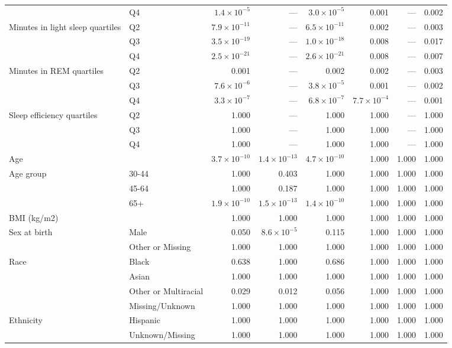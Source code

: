 \documentclass[11pt]{article}
\begin{document}
\begin{longtable}{@{}p{4.0cm}p{2.6cm}rrrrrr@{}}
 & Q4 & $1.4\times10^{-5}$ & --- & $3.0\times10^{-5}$ & 0.001 & --- & 0.002 \\
Minutes in light sleep quartiles & Q2 & $7.9\times10^{-11}$ & --- & $6.5\times10^{-11}$ & 0.002 & --- & 0.003 \\
 & Q3 & $3.5\times10^{-19}$ & --- & $1.0\times10^{-18}$ & 0.008 & --- & 0.017 \\
 & Q4 & $2.5\times10^{-21}$ & --- & $2.6\times10^{-21}$ & 0.008 & --- & 0.007 \\
Minutes in REM quartiles & Q2 & 0.001 & --- & 0.002 & 0.002 & --- & 0.003 \\
 & Q3 & $7.6\times10^{-6}$ & --- & $3.8\times10^{-5}$ & 0.001 & --- & 0.002 \\
 & Q4 & $3.3\times10^{-7}$ & --- & $6.8\times10^{-7}$ & $7.7\times10^{-4}$ & --- & 0.001 \\
Sleep efficiency quartiles & Q2 & 1.000 & --- & 1.000 & 1.000 & --- & 1.000 \\
 & Q3 & 1.000 & --- & 1.000 & 1.000 & --- & 1.000 \\
 & Q4 & 1.000 & --- & 1.000 & 1.000 & --- & 1.000 \\
Age &  & $3.7\times10^{-10}$ & $1.4\times10^{-13}$ & $4.7\times10^{-10}$ & 1.000 & 1.000 & 1.000 \\
Age group & 30-44 & 1.000 & 0.403 & 1.000 & 1.000 & 1.000 & 1.000 \\
 & 45-64 & 1.000 & 0.187 & 1.000 & 1.000 & 1.000 & 1.000 \\
 & 65+ & $1.9\times10^{-10}$ & $1.5\times10^{-13}$ & $1.4\times10^{-10}$ & 1.000 & 1.000 & 1.000 \\
BMI (kg/m2) &  & 1.000 & 1.000 & 1.000 & 1.000 & 1.000 & 1.000 \\
Sex at birth & Male & 0.050 & $8.6\times10^{-5}$ & 0.115 & 1.000 & 1.000 & 1.000 \\
 & Other or Missing & 1.000 & 1.000 & 1.000 & 1.000 & 1.000 & 1.000 \\
Race & Black & 0.638 & 1.000 & 0.686 & 1.000 & 1.000 & 1.000 \\
 & Asian & 1.000 & 1.000 & 1.000 & 1.000 & 1.000 & 1.000 \\
 & Other or Multiracial & 0.029 & 0.012 & 0.056 & 1.000 & 1.000 & 1.000 \\
 & Missing/Unknown & 1.000 & 1.000 & 1.000 & 1.000 & 1.000 & 1.000 \\
Ethnicity & Hispanic & 1.000 & 1.000 & 1.000 & 1.000 & 1.000 & 1.000 \\
 & Unknown/Missing & 1.000 & 1.000 & 1.000 & 1.000 & 1.000 & 1.000 \\

\end{longtable}
\end{document}
